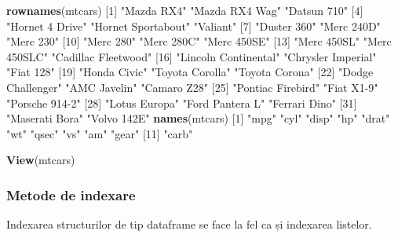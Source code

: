 \documentclass[]{article}
\newenvironment{Shaded}{\begin{snugshade}}{\end{snugshade}}
\newcommand{\KeywordTok}[1]{\textcolor[rgb]{0.13,0.29,0.53}{\textbf{#1}}}
\newcommand{\DecValTok}[1]{\textcolor[rgb]{0.00,0.00,0.81}{#1}}
\newcommand{\StringTok}[1]{\textcolor[rgb]{0.31,0.60,0.02}{#1}}
\newcommand{\NormalTok}[1]{#1}
\begin{document}
\begin{Shaded}
\begin{Highlighting}[]
\KeywordTok{rownames}\NormalTok{(mtcars)}
\NormalTok{ [}\DecValTok{1}\NormalTok{] }\StringTok{"Mazda RX4"}           \StringTok{"Mazda RX4 Wag"}       \StringTok{"Datsun 710"}         
\NormalTok{ [}\DecValTok{4}\NormalTok{] }\StringTok{"Hornet 4 Drive"}      \StringTok{"Hornet Sportabout"}   \StringTok{"Valiant"}            
\NormalTok{ [}\DecValTok{7}\NormalTok{] }\StringTok{"Duster 360"}          \StringTok{"Merc 240D"}           \StringTok{"Merc 230"}           
\NormalTok{[}\DecValTok{10}\NormalTok{] }\StringTok{"Merc 280"}            \StringTok{"Merc 280C"}           \StringTok{"Merc 450SE"}         
\NormalTok{[}\DecValTok{13}\NormalTok{] }\StringTok{"Merc 450SL"}          \StringTok{"Merc 450SLC"}         \StringTok{"Cadillac Fleetwood"} 
\NormalTok{[}\DecValTok{16}\NormalTok{] }\StringTok{"Lincoln Continental"} \StringTok{"Chrysler Imperial"}   \StringTok{"Fiat 128"}           
\NormalTok{[}\DecValTok{19}\NormalTok{] }\StringTok{"Honda Civic"}         \StringTok{"Toyota Corolla"}      \StringTok{"Toyota Corona"}      
\NormalTok{[}\DecValTok{22}\NormalTok{] }\StringTok{"Dodge Challenger"}    \StringTok{"AMC Javelin"}         \StringTok{"Camaro Z28"}         
\NormalTok{[}\DecValTok{25}\NormalTok{] }\StringTok{"Pontiac Firebird"}    \StringTok{"Fiat X1-9"}           \StringTok{"Porsche 914-2"}      
\NormalTok{[}\DecValTok{28}\NormalTok{] }\StringTok{"Lotus Europa"}        \StringTok{"Ford Pantera L"}      \StringTok{"Ferrari Dino"}       
\NormalTok{[}\DecValTok{31}\NormalTok{] }\StringTok{"Maserati Bora"}       \StringTok{"Volvo 142E"}         
\KeywordTok{names}\NormalTok{(mtcars)}
\NormalTok{ [}\DecValTok{1}\NormalTok{] }\StringTok{"mpg"}  \StringTok{"cyl"}  \StringTok{"disp"} \StringTok{"hp"}   \StringTok{"drat"} \StringTok{"wt"}   \StringTok{"qsec"} \StringTok{"vs"}   \StringTok{"am"}   \StringTok{"gear"}
\NormalTok{[}\DecValTok{11}\NormalTok{] }\StringTok{"carb"}

\KeywordTok{View}\NormalTok{(mtcars) }
\end{Highlighting}
\end{Shaded}

\subsubsection{Metode de indexare}\label{metode-de-indexare}

Indexarea structurilor de tip dataframe se face la fel ca și indexarea
listelor.
\end{document}
